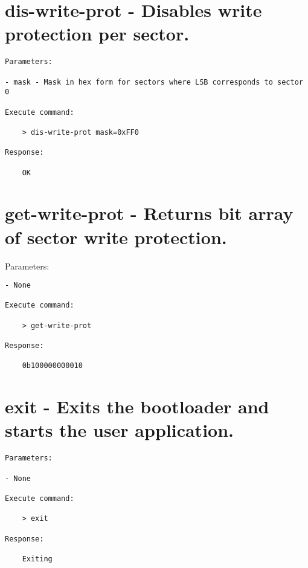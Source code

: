 \section{dis-write-prot - Disables write protection per sector.}
\label{bl_cmd:dis-write-prot}

\begin{lstlisting}
Parameters:

- mask - Mask in hex form for sectors where LSB corresponds to sector 0

Execute command: 

    > dis-write-prot mask=0xFF0
    
Response: 

    OK
\end{lstlisting}

\section{get-write-prot - Returns bit array of sector write protection.}
\label{bl_cmd:get-write-prot}Parameters:

\begin{lstlisting}
- None

Execute command: 

    > get-write-prot
    
Response: 

    0b100000000010
\end{lstlisting}

\section{exit - Exits the bootloader and starts the user application.}
\label{bl_cmd:exit}

\begin{lstlisting}
Parameters:

- None

Execute command: 

    > exit  
    
Response: 

    Exiting
\end{lstlisting}

